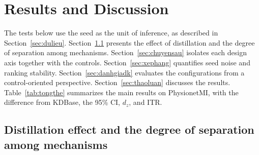 \section{Results and Discussion}
\label{sec:ketqua}

The tests below use the seed as the unit of inference, as described in
Section~\ref{sec:dulieu}. Section~\ref{sec:hieuqua} presents the effect
of distillation and the degree of separation among mechanisms.
Section~\ref{sec:chuyensau} isolates each design axis together with the
controls. Section~\ref{sec:xephang} quantifies seed noise and ranking
stability. Section~\ref{sec:danhgiadk} evaluates the configurations from
a control-oriented perspective. Section~\ref{sec:thaoluan} discusses the
results. Table~\ref{tab:tongthe} summarizes the main results on
PhysionetMI, with the difference from KDBase, the 95\% CI, $d_z$, and ITR.

\subsection{Distillation effect and the degree of separation among mechanisms}
\label{sec:hieuqua}

